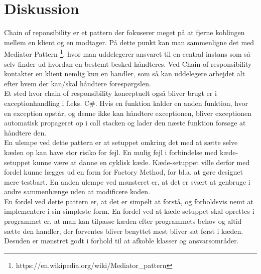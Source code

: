 \chapter{Diskussion}
Chain of reponsibility er et pattern der fokuserer meget på at fjerne koblingen mellem en klient og en modtager. På dette punkt kan man sammenligne det med Mediator Pattern \footnote{https://en.wikipedia.org/wiki/Mediator_pattern}, hvor man uddelegerer ansvaret til en central instans som så selv finder ud hvordan en bestemt besked håndteres.
Ved Chain of responsibility kontakter en klient nemlig kun en handler, som så kan uddelegere arbejdet alt efter hvem der kan/skal håndtere forespørgslen. \\

\noindent Et sted hvor chain of responsibility konceptuelt også bliver brugt er i exceptionhandling i f.eks. C\#. Hvis en funktion kalder en anden funktion, hvor en exception opstår, og denne ikke kan håndtere exceptionen, bliver exceptionen automatisk propageret op i call stacken og lader den næste funktion forsøge at håndtere den. \\

\noindent En ulempe ved dette pattern er at setuppet omkring det med at sætte selve kæden op kan have stor risiko for fejl. En mulig fejl i forbindelse med kæde-setuppet kunne være at danne en cyklisk kæde. Kæde-setuppet ville derfor med fordel kunne lægges ud en form for Factory Method, for bl.a. at gøre designet mere testbart. En anden ulempe ved mønsteret er, at det er svært at genbruge i andre sammenhænge uden at modificere koden. \\
En fordel ved dette pattern er, at det er simpelt at forstå, og forholdsvis nemt at implementere i sin simpleste form. En fordel ved at kæde-setuppet skal oprettes i programmet er, at man kan tilpasse kæden efter programmets behov og altid sætte den handler, der forventes bliver benyttet mest bliver sat først i kæden. 
Desuden er mønstret godt i forhold til at afkoble klasser og ansvarsområder.